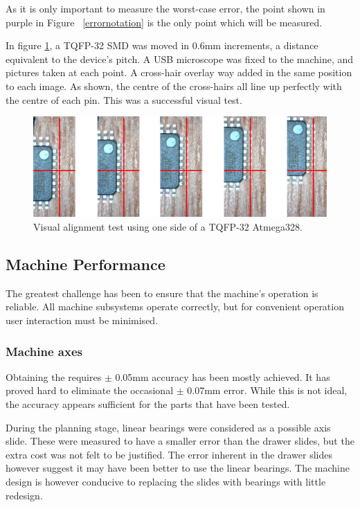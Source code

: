 As it is only important to measure the worst-case error, the point shown in purple in Figure ~\ref{errornotation} is the only point which will be measured. 

In figure \ref{visualtest}, a TQFP-32 SMD was moved in 0.6mm increments, a distance
equivalent to the device's pitch. A USB microscope was fixed to the machine,
and pictures taken at each point. A cross-hair overlay way added in the same
position to each image. As shown, the centre of the cross-hairs all line
up perfectly with the centre of each pin. This was a successful visual test.

\begin{figure}[ht!]
\centering
\includegraphics[width=170mm]{resources/registration.png}
\caption{Visual alignment test using one side of a TQFP-32 Atmega328.}
\label{visualtest}
\end{figure}

\subsection{Machine Performance}
The greatest challenge has been to ensure that the machine's operation is reliable.
All machine subsystems operate correctly, but for convenient operation
user interaction must be minimised. 

\subsubsection{Machine axes}
Obtaining the requires $\pm$ 0.05mm accuracy has been mostly achieved. It has
proved hard to eliminate the occasional $\pm$ 0.07mm error. While this is not
ideal, the accuracy appears sufficient for the parts that have been tested.

During the planning stage, linear bearings were considered as a possible
axis slide. These were measured to have a smaller error than the drawer
slides, but the extra cost was not felt to be justified. The error inherent
in the drawer slides however suggest it may have been better to use the 
linear bearings. The machine design is however conducive to replacing
the slides with bearings with little redesign.

